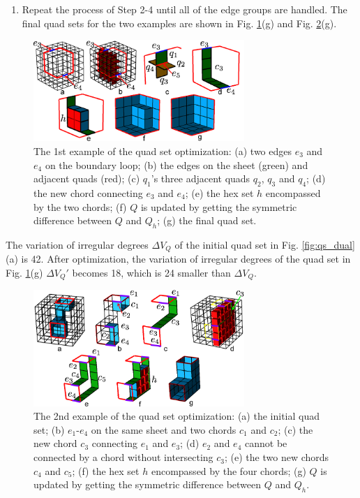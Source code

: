 \documentclass[final,5p,times,twocolumn]{elsarticle}
\begin{document}
\begin{enumerate}
  \item Repeat the process of Step 2-4 until all of the edge groups are handled. The final quad sets for the two examples are shown in Fig. \ref{fig:qs_opt1}(g) and Fig. \ref{fig:qs_opt2}(g).
\end{enumerate}

\begin{figure}[htbp]
\begin{center}
\includegraphics[width=8cm]{figures/qs_opt1.png}
\caption{The 1st example of the quad set optimization: (a) two edges $e_3$ and $e_4$ on the boundary loop; (b) the edges on the sheet (green) and adjacent quads (red); (c) $q_1$'s three adjacent quads $q_2$, $q_3$ and $q_4$; (d) the new chord connecting $e_3$ and $e_4$; (e) the hex set $h$ encompassed by the two chords; (f) $Q$ is updated by getting the symmetric difference between $Q$ and $Q_h$; (g) the final quad set.}
\label{fig:qs_opt1}
\end{center}
\end{figure}

The variation of irregular degrees $\Delta V_Q$ of the initial quad set in Fig. \ref{fig:qs_dual}(a) is 42. After optimization, the variation of irregular degrees of the quad set in Fig. \ref{fig:qs_opt1}(g) $\Delta V_Q'$ becomes 18, which is 24 smaller than $\Delta V_Q$.

\begin{figure}[htbp]
\begin{center}
\includegraphics[width=8cm]{figures/qs_opt2.png}
\caption{The 2nd example of the quad set optimization: (a) the initial quad set; (b) $e_1$-$e_4$ on the same sheet and two chords $c_1$ and $c_2$; (c) the new chord $c_3$ connecting $e_1$ and $e_3$; (d) $e_2$ and $e_4$ cannot be connected by a chord without intersecting $c_3$; (e) the two new chords $c_4$ and $c_5$; (f) the hex set $h$ encompassed by the four chords; (g) $Q$ is updated by getting the symmetric difference between $Q$ and $Q_h$.}
\label{fig:qs_opt2}
\end{center}
\end{figure}
\end{document}
